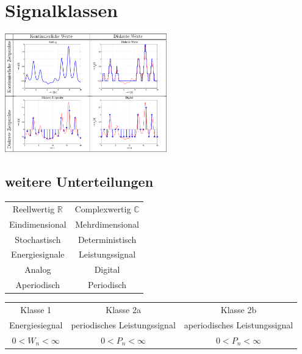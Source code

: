 \section{Signalklassen}
\begin{multicols}{2}
    \includegraphics[width = 7cm]{include/Signalklassen/img/Signalklassen.png}
    \subsection{weitere Unterteilungen}
    \begin{tabular}{|c|c|}
        Reellwertig $\mathbb{R}$ & Complexwertig $\mathbb{C}$ \\
        Eindimensional           & Mehrdimensional            \\
        Stochastisch             & Deterministisch            \\
        Energiesignale           & Leistungssignal            \\
        Analog                   & Digital                    \\
        Aperiodisch              & Periodisch                 \\
    \end{tabular}
\end{multicols}
\begin{tabular}{ccc}
    Klasse 1            &
    Klasse 2a           &
    Klasse 2b                                                                          \\
    Energiesiegnal      & periodisches Leistungssignal & aperiodisches Leistungssignal \\
    $0 < W_n < \infty $ & $0 < P_n < \infty $          & $0 < P_n < \infty$
\end{tabular}
